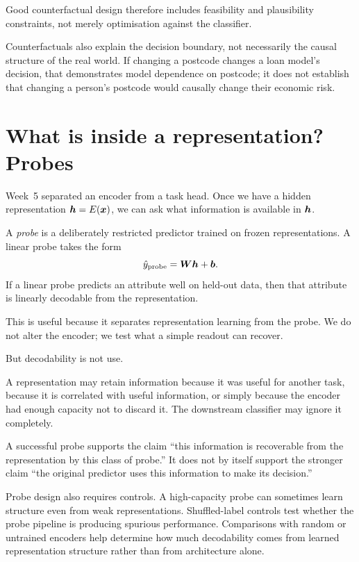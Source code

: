 Good counterfactual design therefore includes feasibility and plausibility constraints, not merely optimisation against the classifier.

Counterfactuals also explain the decision boundary, not necessarily the causal structure of the real world. If changing a postcode changes a loan model's decision, that demonstrates model dependence on postcode; it does not establish that changing a person's postcode would causally change their economic risk.

\section{What is inside a representation? Probes}

Week~5 separated an encoder from a task head. Once we have a hidden representation \(\bm{h}=E(\bm{x})\), we can ask what information is available in \(\bm{h}\).

A \emph{probe} is a deliberately restricted predictor trained on frozen representations. A linear probe takes the form
\[
  \hat y_{\mathrm{probe}} = \bm{W}\bm{h}+\bm{b}.
\]
If a linear probe predicts an attribute well on held-out data, then that attribute is linearly decodable from the representation.

This is useful because it separates representation learning from the probe. We do not alter the encoder; we test what a simple readout can recover.

But decodability is not use.

A representation may retain information because it was useful for another task, because it is correlated with useful information, or simply because the encoder had enough capacity not to discard it. The downstream classifier may ignore it completely.

\begin{keyidea}
A successful probe supports the claim ``this information is recoverable from the representation by this class of probe.'' It does not by itself support the stronger claim ``the original predictor uses this information to make its decision.''
\end{keyidea}

Probe design also requires controls. A high-capacity probe can sometimes learn structure even from weak representations. Shuffled-label controls test whether the probe pipeline is producing spurious performance. Comparisons with random or untrained encoders help determine how much decodability comes from learned representation structure rather than from architecture alone.

